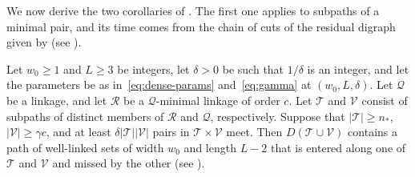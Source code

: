 \documentclass[fontsize=12pt,leading=14pt]{fullpaper}
\newcommand{\Qcal}{\mathcal{Q}}
\newcommand{\Rcal}{\mathcal{R}}
\newcommand{\Tcal}{\mathcal{T}}
\newcommand{\Vcal}{\mathcal{V}}
\begin{document}
We now derive the two corollaries of .
The first one applies to subpaths of a minimal pair, and its time comes from the chain of cuts of the residual digraph given by  (see ).

\begin{corollary}\label{cor:timed-dense}
  Let $w_0\ge1$ and $L\ge3$ be integers, let $\delta>0$ be such that $1/\delta$ is an integer, and let the parameters be as in~\eqref{eq:dense-params} and~\eqref{eq:gamma} at $(w_0,L,\delta)$.
  Let $\Qcal$ be a linkage, and let $\Rcal$ be a $\Qcal$-minimal linkage of order $c$.
  Let $\Tcal$ and $\Vcal$ consist of subpaths of distinct members of $\Rcal$ and $\Qcal$, respectively.
  Suppose that $|\Tcal|\ge n_*$, $|\Vcal|\ge\gamma c$, and at least $\delta|\Tcal||\Vcal|$ pairs in $\Tcal\times\Vcal$ meet.
  Then $D(\Tcal\cup\Vcal)$ contains a path of well-linked sets of width $w_0$ and length $L-2$ that is entered along one of $\Tcal$ and $\Vcal$ and missed by the other (see ).
\end{corollary}
\end{document}
